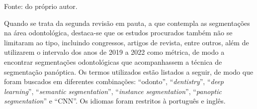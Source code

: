 \begin{table}[H]
    \centering
    \caption{Trabalhos selecionados a partir da revisão sobre segmentação panóptica.}
    \label{project:revision:tab:1}

    \vspace*{1 cm}
    Fonte: do próprio autor.
\end{table}

Quando se trata da segunda revisão em pauta, a que contempla as segmentações na área odontológica, destaca-se que os estudos procurados também não se limitaram ao tipo, incluindo congressos, artigos de revista, entre outros, além de utilizarem o intervalo dos anos de 2019 a 2022 como métrica, de modo a encontrar segmentações odontológicas que acompanhassem a técnica de segmentação panóptica. Os termos utilizados estão listados a seguir, de modo que foram buscados em diferentes combinações: ``odonto'', ``\textit{dentistry}'', ``\textit{deep learning}'', ``\textit{semantic segmentation}'', ``\textit{instance segmentation}'', ``\textit{panoptic segmentation}'' e ``CNN''. Os idiomas foram restritos à português e inglês.

